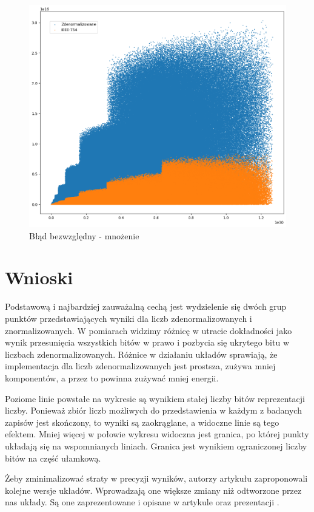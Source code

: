 \documentclass{article}
\begin{document}
\begin{figure}[H]
	\centering
	\includegraphics[height=0.4\textheight]{figures/mul_ulp.png}
	\caption{Błąd bezwzględny - mnożenie}
	\label{fig:mul_ulp}
\end{figure}


\section{Wnioski}
Podstawową i najbardziej zauważalną cechą jest wydzielenie się dwóch grup punktów przedstawiających wyniki dla liczb zdenormalizowanych i znormalizowanych.
W pomiarach widzimy różnicę w utracie dokładności jako wynik przesunięcia wszystkich bitów w prawo i pozbycia się ukrytego bitu w liczbach zdenormalizowanych.
Różnice w działaniu układów sprawiają, że implementacja dla liczb zdenormalizowanych jest prostsza, zużywa mniej komponentów, a przez to powinna zużywać mniej energii.

Poziome linie powstałe na wykresie są wynikiem stałej liczby bitów reprezentacji liczby.
Ponieważ zbiór liczb możliwych do przedstawienia w każdym z badanych zapisów jest skończony, to wyniki są zaokrąglane, a widoczne linie są tego efektem.
Mniej więcej w połowie wykresu widoczna jest granica, po której punkty układają się na wspomnianych liniach.
Granica jest wynikiem ograniczonej liczby bitów na część ułamkową.

Żeby zminimalizować straty w precyzji wyników, autorzy artykułu \cite{art:old} zaproponowali kolejne wersje układów.
Wprowadzają one większe zmiany niż odtworzone przez nas układy.
Są one zaprezentowane i opisane w artykule \cite{art:new} oraz prezentacji \cite{pdf:pres}.
\end{document}
